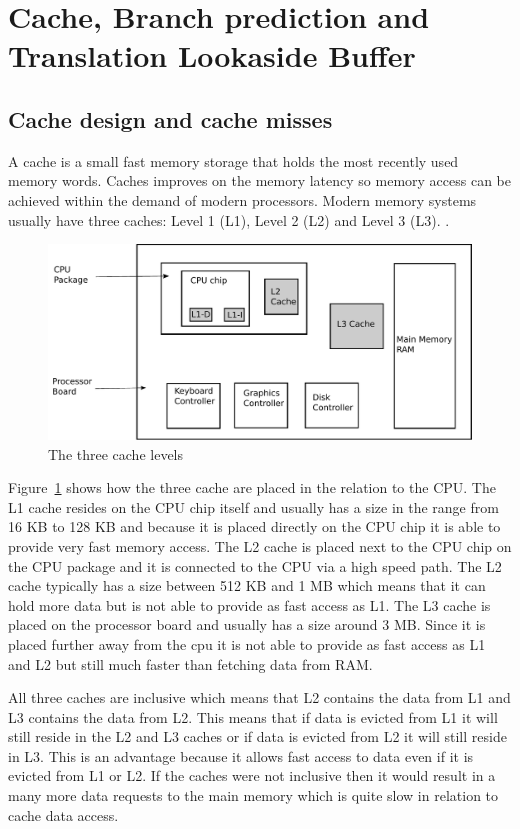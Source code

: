 \section{Cache, Branch prediction and Translation Lookaside Buffer}

\subsection{Cache design and cache misses}

A cache is a small fast memory storage that holds the most recently used memory words.
Caches improves on the memory latency so memory access can be achieved within the demand of modern processors.
Modern memory systems usually have three caches: Level 1 (L1), Level 2 (L2) and Level 3 (L3). \citep[Section~4.5.1]{Tanenbaum}.

\begin{figure}
\includegraphics[width=\textwidth]{CacheLevels.pdf}
\caption{The three cache levels}
\label{fig:CacheLevels}
\end{figure}

Figure~\ref{fig:CacheLevels} shows how the three cache are placed in the relation to the CPU. 
The L1 cache resides on the CPU chip itself and usually has a size in the range from 16 KB to 128 KB and because it is placed directly on the CPU chip it is able to provide very fast memory access.
The L2 cache is placed next to the CPU chip on the CPU package and it is connected to the CPU via a high speed path. The L2 cache typically has a size between 512 KB and 1 MB which means that it can hold more data but is not able to provide as fast access as L1.
The L3 cache is placed on the processor board and usually has a size around 3 MB. Since it is placed further away from the cpu it is not able to provide as fast access as L1 and L2 but still much faster than fetching data from RAM.

All three caches are inclusive which means that L2 contains the data from L1 and L3 contains the data from L2.
This means that if data is evicted from L1 it will still reside in the L2 and L3 caches or if data is evicted from L2 it will still reside in L3. 
This is an advantage because it allows fast access to data even if it is evicted from L1 or L2. 
If the caches were not inclusive then it would result in a many more data requests to the main memory which is quite slow in relation to cache data access.

